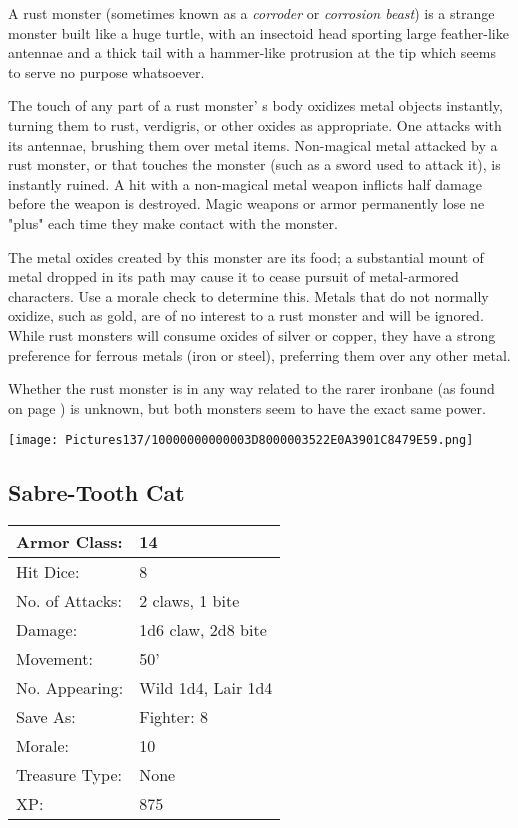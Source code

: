 \documentclass[a4paper,twoside,openany,10pt]{book}
\begin{document}
\begin{multicols}{2}
A rust monster (sometimes known as a \emph{corroder} or \emph{corrosion beast}) is a strange monster built like a huge turtle, with an insectoid head sporting large feather-like antennae and a thick tail with a hammer-like protrusion at the tip which seems to serve no purpose whatsoever.

The touch of any part of a rust monster' s body oxidizes metal objects instantly, turning them to rust, verdigris, or other oxides as appropriate. One attacks with its antennae, brushing them over metal items. Non-magical metal attacked by a rust monster, or that touches the monster (such as a sword used to attack it), is instantly ruined. A hit with a non-magical metal weapon inflicts half damage before the weapon is destroyed. Magic weapons or armor permanently lose ne "plus" each time they make contact with the monster. 

The metal oxides created by this monster are its food; a substantial mount of metal dropped in its path may cause it to cease pursuit of metal-armored characters. Use a morale check to determine this. Metals that do not normally oxidize, such as gold, are of no interest to a rust monster and will be ignored. While rust monsters will consume oxides of silver or copper, they have a strong preference for ferrous metals (iron or steel), preferring them over any other metal.

Whether the rust monster is in any way related to the rarer ironbane (as found on page \hyperlink{ironbane}{\pageref{ironbane}}) is unknown, but both monsters seem to have the exact same power.

\begin{center} \texttt{[image: Pictures137/10000000000003D8000003522E0A3901C8479E59.png]} \end{center}

\subsection*{Sabre-Tooth Cat}\label{sabre-tooth-cat}

\begin{tabularx}{0.50\textwidth}{@{}lX@{}}
Armor Class: & 14 \\\hline
Hit Dice: & 8 \\\hline
No. of Attacks: & 2 claws, 1 bite \\\hline
Damage: & 1d6 claw, 2d8 bite \\\hline
Movement: & 50' \\\hline
No. Appearing: & Wild 1d4, Lair 1d4 \\\hline
Save As: & Fighter: 8 \\\hline
Morale: & 10 \\\hline
Treasure Type: & None \\\hline
XP: & 875 \\\hline
\end{tabularx}\medskip


\end{multicols}
\end{document}
